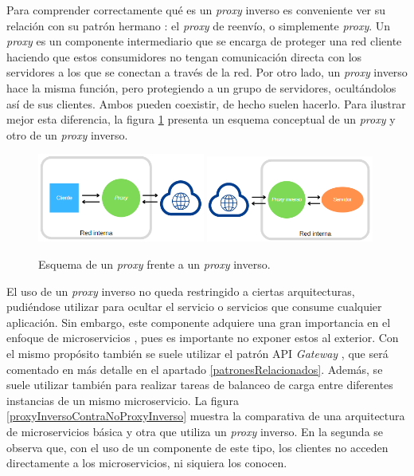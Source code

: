 \documentclass[11pt,spanish,listoffigures]{tfgetsinf}
\begin{document}
Para comprender correctamente qué es un \emph{proxy} inverso es conveniente ver su relación con su patrón hermano \cite{ConceptosMicroservicios}: el \emph{proxy} de reenvío, o simplemente \emph{proxy}. Un \emph{proxy} es un componente intermediario que se encarga de proteger una red cliente haciendo que estos consumidores no tengan comunicación directa con los servidores a los que se conectan a través de la red. Por otro lado, un \emph{proxy} inverso hace la misma función, pero protegiendo a un grupo de servidores, ocultándolos así de sus clientes. Ambos pueden coexistir, de hecho suelen hacerlo. Para ilustrar mejor esta diferencia, la figura \ref{proxyContraProxyInverso} presenta un esquema conceptual de un \emph{proxy} y otro de un \emph{proxy} inverso.

\begin{figure}[ht]
\centering
\includegraphics[width=0.49\textwidth]{imagenes/proxy}
\includegraphics[width=0.49\textwidth]{imagenes/proxyInverso}
\caption{Esquema de un \emph{proxy} frente a un \emph{proxy} inverso.}
	\label{proxyContraProxyInverso}
\end{figure}

El uso de un \emph{proxy} inverso no queda restringido a ciertas arquitecturas, pudiéndose utilizar para ocultar el servicio o servicios que consume cualquier aplicación. Sin embargo, este componente adquiere una gran importancia en el enfoque de microservicios \cite{ReverseProxyForMicroservices}, pues es importante no exponer estos al exterior. Con el mismo propósito también se suele utilizar el patrón API \emph{Gateway} \cite{ApiGatewayParaMicroservicios}, que será comentado en más detalle en el apartado \ref{patronesRelacionados}. Además, se suele utilizar también para realizar tareas de balanceo de carga entre diferentes instancias de un mismo microservicio. La figura \ref{proxyInversoContraNoProxyInverso} muestra la comparativa de una arquitectura de microservicios básica y otra que utiliza un \emph{proxy} inverso. En la segunda se observa que, con el uso de un componente de este tipo, los clientes no acceden directamente a los microservicios, ni siquiera los conocen.
\end{document}
